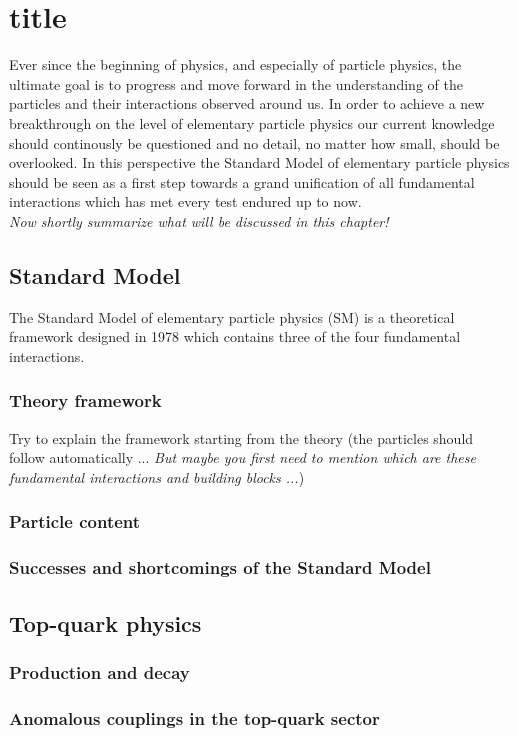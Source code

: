 \chapter{title} \label{chp:SM}

Ever since the beginning of physics, and especially of particle physics, the ultimate goal is to progress and move forward in the understanding of the particles and their interactions observed around us. 
In order to achieve a new breakthrough on the level of elementary particle physics our current knowledge should continously be questioned and no detail, no matter how small, should be overlooked.
In this perspective the Standard Model of elementary particle physics should be seen as a first step towards a grand unification of all fundamental interactions which has met every test endured up to now.
\\
\textit{Now shortly summarize what will be discussed in this chapter!}

\section{Standard Model}
The Standard Model of elementary particle physics (SM) is a theoretical framework designed in 1978 which contains three of the four fundamental interactions.

\subsection{Theory framework}
Try to explain the framework starting from the theory (the particles should follow automatically ... \textit{But maybe you first need to mention which are these fundamental interactions and building blocks ...})

\subsection{Particle content}

\subsection{Successes and shortcomings of the Standard Model}

\section{Top-quark physics}

\subsection{Production and decay}

\subsection{Anomalous couplings in the top-quark sector}